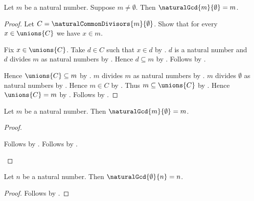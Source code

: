 \begin{proposition}\label{natural_gcd_positive_zero}
    Let $m$ be a natural number.
    Suppose $m\neq\emptyset$.
    Then $\naturalGcd{m}{\emptyset}=m$.
\end{proposition}
\begin{proof}
    Let $C=\naturalCommonDivisors{m}{\emptyset}$.
    Show that for every $x\in\unions{C}$ we have $x\in m$.
    \begin{subproof}
        Fix $x\in\unions{C}$.
        Take $d\in C$ such that $x\in d$ by .
        $d$ is a natural number and
            $d$ divides $m$ as natural numbers
            by .
        Hence $d\subseteq m$
            by .
        Follows by .
    \end{subproof}
    Hence $\unions{C}\subseteq m$ by .
    $m$ divides $m$ as natural numbers
        by .
    $m$ divides $\emptyset$ as natural numbers
        by .
    Hence $m\in C$
        by .
    Thus $m\subseteq\unions{C}$ by .
    Hence $\unions{C}=m$ by .
    Follows by
        .
\end{proof}

\begin{theorem}\label{natural_gcd_zero_right}
    Let $m$ be a natural number.
    Then $\naturalGcd{m}{\emptyset}=m$.
\end{theorem}
\begin{proof}
    \begin{byCase}
            Follows by .
            Follows by .
    \end{byCase}
\end{proof}

\begin{corollary}\label{natural_gcd_zero_left}
    Let $n$ be a natural number.
    Then $\naturalGcd{\emptyset}{n}=n$.
\end{corollary}
\begin{proof}
    Follows by
        .
\end{proof}

